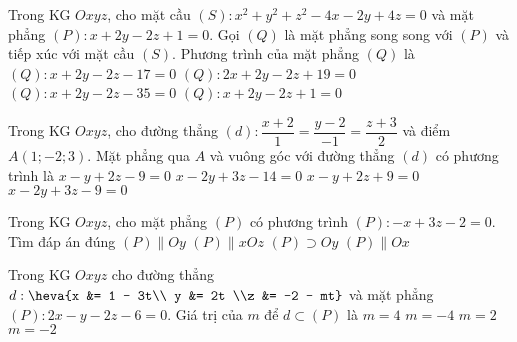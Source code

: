 	\begin{ex}%
	Trong KG $Oxyz$, cho mặt cầu $(S)\colon x^2+y^2+z^2-4x-2y+4z=0$ và mặt phẳng $(P)\colon x+2y-2z+1=0$. Gọi $(Q)$ là mặt phẳng song song với $(P)$ và tiếp xúc với mặt cầu $(S)$. Phương trình của mặt phẳng $(Q)$ là
	\choice
	{\True $(Q): x+2y-2z-17=0 $}
	{$(Q): 2x+2y-2z+19=0 $}
	{$(Q): x+2y-2z-35=0 $}
	{ $(Q): x+2y-2z+1=0 $}
	\end{ex}
	\begin{ex}%
	Trong KG $Oxyz$, cho đường thẳng $(d)\colon \dfrac{x+2}{1}=\dfrac{y-2}{-1}=\dfrac{z+3}{2}$ và điểm $A(1;-2;3)$. Mặt phẳng qua $A$ và vuông góc với đường thẳng $(d)$ có phương trình là
	\choice
	{\True $x-y+2z-9=0$}
	{$x-2y+3z-14=0$}
	{$x-y+2z+9=0$}
	{$x-2y+3z-9=0$}
	\end{ex}
	\begin{ex}%
	Trong KG $Oxyz$, cho mặt phẳng $(P)$ có phương trình $(P): -x + 3z - 2 = 0$. Tìm đáp án đúng 
	\choice
	{\True $(P) \parallel Oy$}
	{$(P) \parallel xOz$}
	{$(P) \supset Oy$}
	{$(P) \parallel Ox$}
	\end{ex}
	\begin{ex}%
	Trong KG $Oxyz$ cho đường thẳng $d: \heva{x &= 1 - 3t\\ y &= 2t \\z &= -2 - mt}$ và mặt phẳng $(P): 2x - y - 2z - 6 = 0$. Giá trị của $m$ để $d \subset (P)$ là 
	\choice
	{\True $m = 4$}
	{$m = -4$}
	{$m = 2$}
	{$m = -2$}
	\end{ex}
